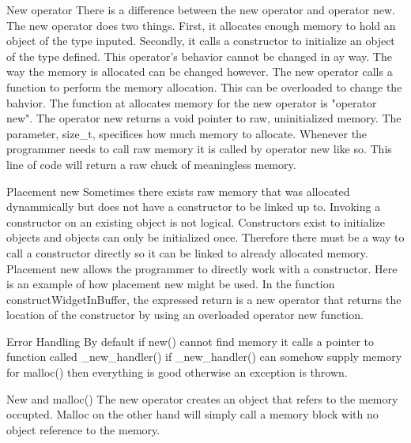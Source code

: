 \documentclass[letterpaper, 12pt]{article}
\begin{document}
	New operator
	There is a difference between the new operator and operator new. The new operator does two things.
	First, it allocates enough memory to hold an object of the type inputed. Secondly, it calls a constructor to initialize an object of 		the type defined. This operator's behavior cannot be changed in ay way. The way the memory is allocated can be changed 			however. The new operator calls a function to perform the memory allocation. This can be overloaded to change the bahvior. 			The function at allocates memory for the new operator is "operator new". 
	The operator new returns a void pointer to raw, uninitialized memory. The parameter, size_t, specifices how much memory to allocate. Whenever the programmer needs to call raw memory it is called by operator new like so.
	This line of code will return a raw chuck of meaningless memory.
	
	Placement new
	Sometimes there exists raw memory that was allocated dynammically but does not have a constructor to be linked up to. Invoking a constructor on an existing object is not logical. Constructors exist to initialize objects and objects can only be initialized once. Therefore there must be a way to call a constructor directly so it can be linked to already allocated memory. Placement new allows the programmer to directly work with a constructor. Here is an example of how placement new might be used.
	In the function constructWidgetInBuffer, the expressed return is a new operator that returns the location of the constructor by using an overloaded operator new function.
	
	Error Handling
	By default if new() cannot find memory it calls a pointer to function called _new_handler()
	if _new_handler() can somehow supply memory for malloc() then everything is good otherwise an exception is thrown.
	
	New and malloc()
	The new operator creates an object that refers to the memory occupted. Malloc on the other hand will simply call a memory block with no object reference to the memory.
\end{document}
